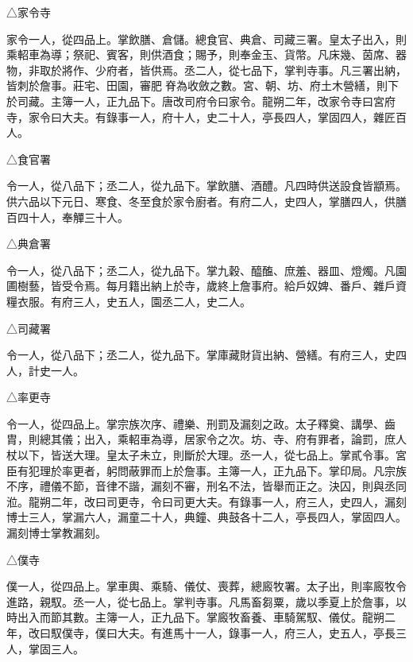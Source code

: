 \begin{pinyinscope}
 △家令寺



 家令一人，從四品上。掌飲膳、倉儲。總食官、典倉、司藏三署。皇太子出入，則乘軺車為導；祭祀、賓客，則供酒食；賜予，則奉金玉、貨幣。凡床幾、茵席、器物，非取於將作、少府者，皆供焉。丞二人，從七品下，掌判寺事。凡三署出納，皆刺於詹事。莊宅、田園，審肥脊為收斂之數。宮、朝、坊、府土木營繕，則下於司藏。主簿一人，正九品下。唐改司府令曰家令。龍朔二年，改家令寺曰宮府寺，家令曰大夫。有錄事一人，府十人，史二十人，亭長四人，掌固四人，雜匠百人。



 △食官署



 令一人，從八品下；丞二人，從九品下。掌飲膳、酒醴。凡四時供送設食皆顓焉。供六品以下元日、寒食、冬至食於家令廚者。有府二人，史四人，掌膳四人，供膳百四十人，奉觶三十人。



 △典倉署



 令一人，從八品下；丞二人，從九品下。掌九穀、醯醢、庶羞、器皿、燈燭。凡園圃樹藝，皆受令焉。每月籍出納上於寺，歲終上詹事府。給戶奴婢、番戶、雜戶資糧衣服。有府三人，史五人，園丞二人，史二人。



 △司藏署



 令一人，從八品下；丞二人，從九品下。掌庫藏財貨出納、營繕。有府三人，史四人，計史一人。



 △率更寺



 令一人，從四品上。掌宗族次序、禮樂、刑罰及漏刻之政。太子釋奠、講學、齒胄，則總其儀；出入，乘軺車為導，居家令之次。坊、寺、府有罪者，論罰，庶人杖以下，皆送大理。皇太子未立，則斷於大理。丞一人，從七品上。掌貳令事。宮臣有犯理於率更者，躬問蔽罪而上於詹事。主簿一人，正九品下。掌印局。凡宗族不序，禮儀不節，音律不諧，漏刻不審，刑名不法，皆舉而正之。決囚，則與丞同涖。龍朔二年，改曰司更寺，令曰司更大夫。有錄事一人，府三人，史四人，漏刻博士三人，掌漏六人，漏童二十人，典鐘、典鼓各十二人，亭長四人，掌固四人。漏刻博士掌教漏刻。



 △僕寺



 僕一人，從四品上。掌車輿、乘騎、儀仗、喪葬，總廄牧署。太子出，則率廄牧令進路，親馭。丞一人，從七品上。掌判寺事。凡馬畜芻粟，歲以季夏上於詹事，以時出入而節其數。主簿一人，正九品下。掌廄牧畜養、車騎駕馭、儀仗。龍朔二年，改曰馭僕寺，僕曰大夫。有進馬十一人，錄事一人，府三人，史五人，亭長三人，掌固三人。




\end{pinyinscope}
